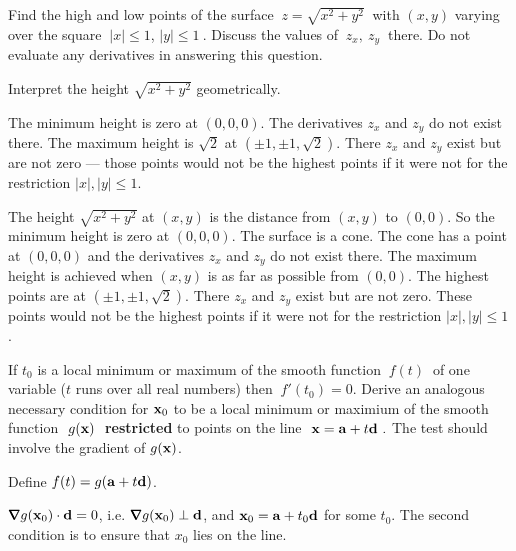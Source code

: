 \begin{question}
Find the high and low points of the surface $\ z=\sqrt{x^2+y^2}\ $ with $(x,y)$ 
varying over the square $\ |x|\le 1$, $|y|\le 1\ $. Discuss the values of 
$\ z_x,\ z_y\ $ there. Do not evaluate any derivatives in answering this 
question.
\end{question}

\begin{hint}
Interpret the height $\sqrt{x^2+y^2}$ geometrically.
\end{hint}

\begin{answer}
The minimum height is zero at $(0,0,0)$. The derivatives 
$z_x$ and $z_y$ do not exist there. 
The maximum height is $\sqrt{2}$ at $(\pm 1,\pm 1,\sqrt{2})$. 
There $z_x$ and $z_y$ exist but are not zero --- those points would 
not be the highest points if it were not for the restriction 
$|x|,|y|\le 1$.
\end{answer}

\begin{solution}
The height $\sqrt{x^2+y^2}$ at $(x,y)$ is the distance from $(x,y)$
to $(0,0)$. So the minimum height is zero at $(0,0,0)$. The surface is a 
cone. The cone has a point at $(0,0,0)$ and the derivatives 
$z_x$ and $z_y$ do not exist there. 
The maximum height is achieved when $(x,y)$ is as far as possible from
$(0,0)$. The highest points are at $(\pm 1,\pm 1,\sqrt{2})$. There 
$z_x$ and $z_y$ exist but are not zero. These points would not 
be the highest points if it were not for the restriction $|x|,|y|\le 1$.
\end{solution}

\begin{question}
If $t_0$ is a local minimum or maximum of the smooth function $\ f(t)\ $
of one variable ($t$ runs over all real numbers) then $\ f'(t_0)=0.$
Derive an analogous necessary condition for $\mathbf{x}_0$ to be a local minimum
or maximium of the smooth function $\ g(\mathbf{x})\ $ \textbf{restricted} to points on
the line $\ \mathbf{x}=\mathbf{a}+t\mathbf{d}\ .$ The test should involve the gradient 
of $g(\mathbf{x})$. 

\end{question}

\begin{hint}
Define $f(t)=g(\mathbf{a}+t\mathbf{d})$.
\end{hint}

\begin{answer}
$\vnabla g(\vx_0)\cdot\vd=0$, i.e. $\vnabla g(\vx_0)\perp\vd$, and $\mathbf{x}_0=\mathbf{a}+t_0\mathbf{d}$ for some $t_0$. 
The second condition is to ensure that $x_0$ lies on the line.
\end{answer}

